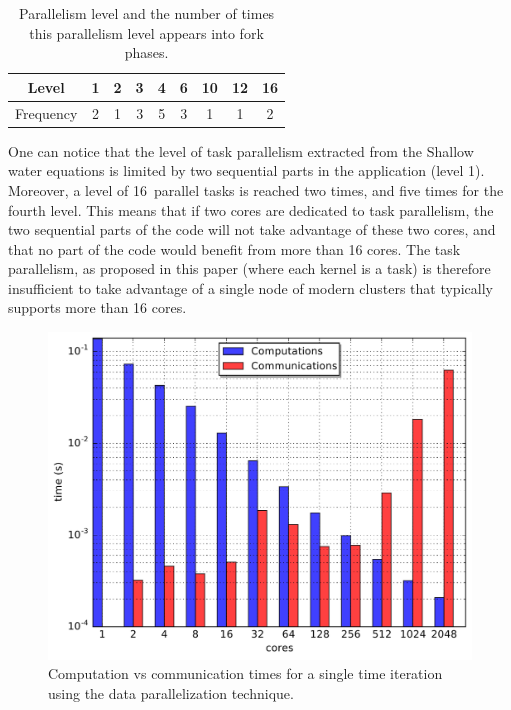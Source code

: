 \begin{table}[th]
 \begin{center}
 \begin{tabular}{|c|c|c|c|c|c|c|c|c|}
   Level & 1 & 2 & 3 & 4 & 6 & 10 & 12 & 16\\
   \hline
   Frequency & 2 & 1 & 3 & 5 & 3 & 1 & 1 & 2\\
 \end{tabular}
\caption{Parallelism level and the number of times this parallelism level appears into fork phases.}
\label{fig:freq}
 \end{center}
\end{table}

One can notice that the level of task parallelism extracted from the Shallow water equations is limited by two sequential parts in the application (level 1). Moreover, a level of 16~parallel tasks is reached two times, and five times for the fourth level.
This means that if two cores are dedicated to task parallelism, the two sequential parts of the code will not take advantage of these two cores, and that no part of the code would benefit from more than 16 cores. The task parallelism, as proposed in this paper (\ie where each kernel is a task) is therefore insufficient to take advantage of a single node of modern clusters that typically supports more than 16 cores.

\begin{figure}[th]\begin{center}
  \includegraphics[width=.6\textwidth]{../results/task_scaling/500_200/analytic/times2.pdf}
  \caption{Computation vs communication times for a single time iteration using the data parallelization technique.}
  \label{fig:limit}
\end{center}\end{figure}

